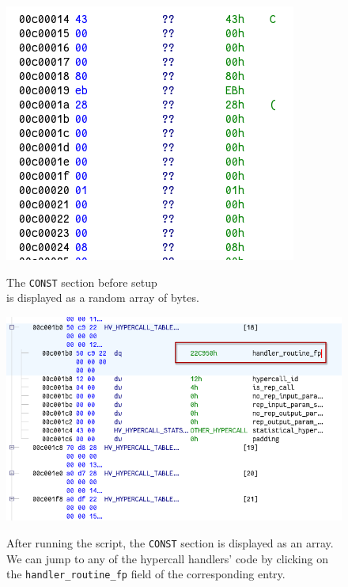 \documentclass[runningheads]{llncs}
\newcommand{\cc}{\lstinline[mathescape]}
\begin{document}
\begin{figure}
\centering
\begin{minipage}{.5\textwidth}
  \centering
  \includegraphics[width=0.88\linewidth]{./assets/const_before.png}
  \caption{The \cc{CONST} section before setup \\is displayed as a random
    array of bytes.}
  \label{fig:const_before}
\end{minipage}%
\begin{minipage}{.5\textwidth}
  \centering
  \includegraphics[width=0.98\linewidth]{./assets/const_after.png}
  \caption{After running the script, the \cc{CONST} section is displayed as
    an array. We can jump to any of the hypercall handlers' code by clicking on
    the \cc{handler_routine_fp} field of the corresponding entry.}
  \label{fig:const_after}
\end{minipage}
\end{figure}
\end{document}
